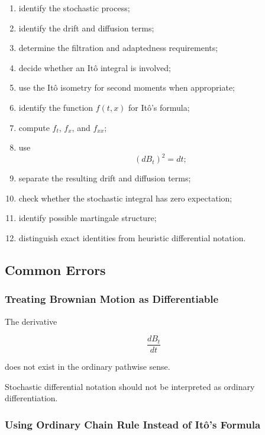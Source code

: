 \begin{enumerate}
    \item identify the stochastic process;
    \item identify the drift and diffusion terms;
    \item determine the filtration and adaptedness requirements;
    \item decide whether an It\^o integral is involved;
    \item use the It\^o isometry for second moments when appropriate;
    \item identify the function \(f(t,x)\) for It\^o's formula;
    \item compute \(f_t\), \(f_x\), and \(f_{xx}\);
    \item use
    \[
    (dB_t)^2=dt;
    \]
    \item separate the resulting drift and diffusion terms;
    \item check whether the stochastic integral has zero expectation;
    \item identify possible martingale structure;
    \item distinguish exact identities from heuristic differential
          notation.
\end{enumerate}

\subsection{Common Errors}
\label{subsec:stochastic-calculus-common-errors}

\subsubsection{Treating Brownian Motion as Differentiable}

The derivative

\[
\frac{dB_t}{dt}
\]

does not exist in the ordinary pathwise sense.

Stochastic differential notation should not be interpreted as ordinary
differentiation.

\subsubsection{Using Ordinary Chain Rule Instead of It\^o's Formula}

